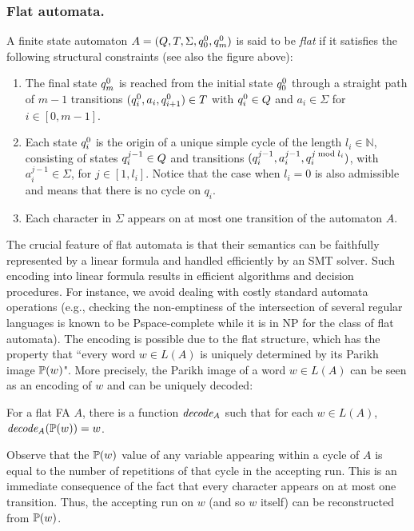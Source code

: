 \documentclass[sigplan,screen]{acmart}
\begin{document}
	
\subsubsection*{Flat automata.} 
A finite state automaton  
$A = (Q,T,\Sigma,q_{0}^{0},q_{m}^{0})$ is said to be \emph{flat} if it satisfies the following structural constraints (see also the figure above):
\begin{enumerate}
	\item The final state $q_{m}^{0}$ is reached from  the initial state $q_{0}^{0}$ through a straight path of $m-1$ transitions $(q_{i}^{0},a_i,q_{i+1}^{0}) \in T$ with $q_{i}^{0} \in Q$ and $a_i \in \Sigma$ for $i\in[0,m-1]$. 
	\item  
Each state $q_{i}^{0}$ is the origin of a unique simple cycle of the length $l_i\in\mathbb{N}$, consisting of states $q_{i}^{j-1} \in Q$ and transitions $(q_{i}^{j-1}, a_{i}^{j-1}, q_{i}^{j \bmod l_i})$, with $a_{i}^{j-1} \in \Sigma$, for $j\in [1,l_i]$. 
Notice that the case when $l_i = 0$ is also admissible and means that there is no cycle on $q_i$.
	\item Each character in $\Sigma$ appears on at most one transition of the automaton $A$. 
\end{enumerate} 

The crucial feature of flat automata is that their semantics can be faithfully represented by a linear formula and handled efficiently by an SMT solver. Such encoding into linear formula results in efficient algorithms and decision procedures. For instance, we avoid dealing with costly standard automata operations (e.g., checking  the non-emptiness of the intersection of several regular languages is known to be {\sc Pspace}-complete while it is in {\sc NP} for the class of flat automata).
The encoding is possible due to the flat structure, which has the property that 
``every word $w\in L(A)$ is uniquely determined by its Parikh image $\mathbb{P}{(w)}$". 
More precisely, the Parikh image of a word $w\in L(A)$ can be seen as an encoding of $w$ and can be uniquely decoded:


\begin{lemma}\label{lemma:decoding}
For a flat FA $A$, there is a function $\mathit{decode_{A}}$ such that for each $w\in L(A)$, $\mathit{decode_{A}}(\mathbb{P}{(w)}) = w$. 
\end{lemma}
%
Observe that the $\mathbb{P}{(w)}$ value of any variable appearing within  a cycle of $A$ is equal to the number of repetitions of that cycle in the accepting run. This is an immediate consequence of the fact that 
 every character appears on at most one transition. Thus, the accepting run on $w$ (and so $w$ itself) can be reconstructed from $\mathbb{P}{(w)}$.  
 
\end{document}
